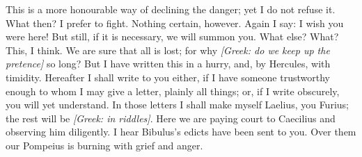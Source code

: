  This is a more honourable way of declining the danger; yet I do not refuse it. What then? I prefer to fight. Nothing certain, however. Again I say: I wish you were here! But still, if it is necessary, we will summon you. What else? What? This, I think. We are sure that all is lost; for why \textit{[Greek: do we keep up the pretence]} so long? But I have written this in a hurry, and, by Hercules, with timidity. Hereafter I shall write to you either, if I have someone trustworthy enough to whom I may give a letter, plainly all things; or, if I write obscurely, you will yet understand. In those letters I shall make myself Laelius, you Furius; the rest will be \textit{[Greek: in riddles]}. Here we are paying court to Caecilius and observing him diligently. I hear Bibulus's edicts have been sent to you. Over them our Pompeius is burning with grief and anger.
